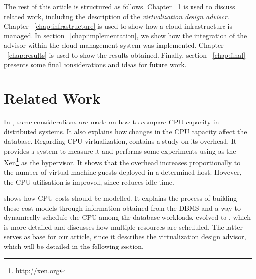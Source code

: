 \documentclass[jidm,a4paper]{jidm} %
\begin{document}

The rest of this article is structured as follows. Chapter ~\ref{chap:relwork} is used to discuss related work, including the description of the \textit{virtualization design advisor}. Chapter ~\ref{chap:infrastructure} is used to show how a cloud infrastructure is managed. In section ~\ref{chap:implementation}, we show how the integration of the advisor within the cloud management system was implemented. Chapter ~\ref{chap:results} is used to show the results obtained. Finally, section ~\ref{chap:final} presents some final considerations and ideas for future work.


\section{Related Work}

\label{chap:relwork}


In \cite{dias:automatic}, some considerations are made on how to compare CPU capacity in distributed systems. It also explains how changes in the CPU capacity affect the database. Regarding CPU virtualization, \cite{6127969} contains a study on its overhead. It provides a system to measure it and performs some experiments using as the Xen\footnote{http://xen.org} as the hypervisor. It shows that the overhead increases proportionally to the number of virtual machine guests deployed in a determined host. However, the CPU utilisation is improved, since reduces idle time. 

\cite{Soror:2008:AVM:1376616.1376711-OLD} shows how CPU costs should be modelled. It explains the process of building these cost models through information obtained from the DBMS and a way to dynamically schedule the CPU among the database workloads. \cite{Soror:2008:AVM:1376616.1376711-OLD} evolved to \cite{Soror:2008:AVM:1376616.1376711}, which is more detailed and discusses how multiple resources are scheduled. The latter serves as base for our article, since it describes the virtualization design advisor, which will be detailed in the following section.
\end{document}
